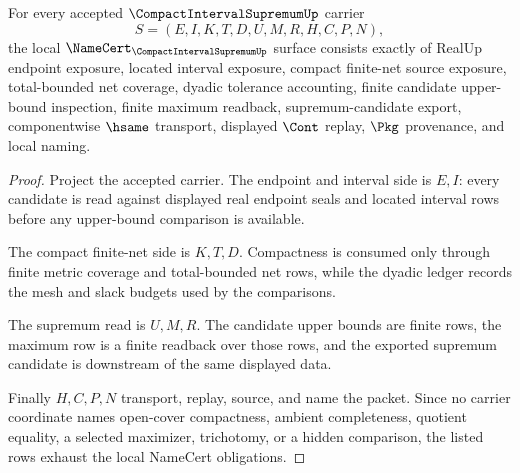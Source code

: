 \begin{theorem}
\label{thm:compact-interval-supremum-namecert-obligations}
For every accepted $\CompactIntervalSupremumUp$ carrier
$$
S=(E,I,K,T,D,U,M,R,H,C,P,N),
$$
the local $\NameCert_{\CompactIntervalSupremumUp}$ surface consists exactly of RealUp endpoint exposure, located interval exposure, compact finite-net source exposure, total-bounded net coverage, dyadic tolerance accounting, finite candidate upper-bound inspection, finite maximum readback, supremum-candidate export, componentwise $\hsame$ transport, displayed $\Cont$ replay, $\Pkg$ provenance, and local naming.
\end{theorem}
\begin{proof}
Project the accepted carrier. The endpoint and interval side is $E,I$: every candidate is read against displayed real endpoint seals and located interval rows before any upper-bound comparison is available.

The compact finite-net side is $K,T,D$. Compactness is consumed only through finite metric coverage and total-bounded net rows, while the dyadic ledger records the mesh and slack budgets used by the comparisons.

The supremum read is $U,M,R$. The candidate upper bounds are finite rows, the maximum row is a finite readback over those rows, and the exported supremum candidate is downstream of the same displayed data.

Finally $H,C,P,N$ transport, replay, source, and name the packet. Since no carrier coordinate names open-cover compactness, ambient completeness, quotient equality, a selected maximizer, trichotomy, or a hidden comparison, the listed rows exhaust the local NameCert obligations.
\end{proof}

